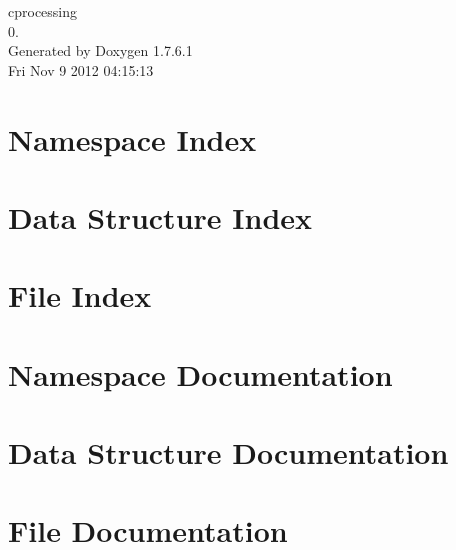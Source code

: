 \documentclass[a4paper]{book}
\begin{document}
\hypersetup{pageanchor=false,citecolor=blue}
\begin{titlepage}
\vspace*{7cm}
\begin{center}
{\Large cprocessing \\[1ex]\large 0. }\\
\vspace*{1cm}
{\large \-Generated by Doxygen 1.7.6.1}\\
\vspace*{0.5cm}
{\small Fri Nov 9 2012 04:15:13}\\
\end{center}
\end{titlepage}
\clearemptydoublepage
{}
\tableofcontents
\clearemptydoublepage
{}
\hypersetup{pageanchor=true,citecolor=blue}
\chapter{\-Namespace \-Index}

\chapter{\-Data \-Structure \-Index}

\chapter{\-File \-Index}

\chapter{\-Namespace \-Documentation}

\chapter{\-Data \-Structure \-Documentation}









\chapter{\-File \-Documentation}























\printindex
\end{document}
